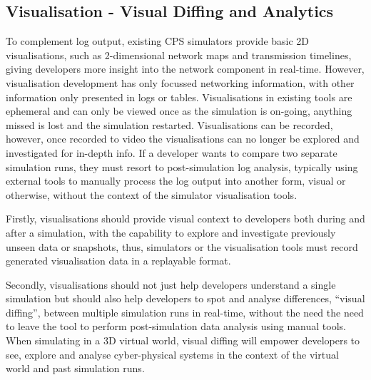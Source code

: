

\subsection{Visualisation - Visual Diffing and Analytics}
\label{sub:requirements_Visualisation}
To complement log output, existing CPS simulators provide basic 2D visualisations, such as 2-dimensional network maps and transmission timelines\cite{cooja_timeline,NS2}, giving developers more insight into the network component in real-time. However, visualisation development has only focussed networking information, with other information only presented in logs or tables. Visualisations in existing tools are ephemeral and can only be viewed once as the simulation is on-going, anything missed is lost and the simulation restarted. Visualisations can be recorded, however, once recorded to video the visualisations can no longer be explored and investigated for in-depth info. If a developer wants to compare two separate simulation runs, they must resort to post-simulation log analysis, typically using external tools to manually process the log output into another form, visual or otherwise, without the context of the simulator visualisation tools.

Firstly, visualisations should provide visual context to developers both during and after a simulation, with the capability to explore and investigate previously unseen data or snapshots, thus, simulators or the visualisation tools must record generated visualisation data in a replayable format.

Secondly, visualisations should not just help developers understand a single simulation but should also help developers to spot and analyse differences, ``visual diffing'', between multiple simulation runs in real-time, without the need the need to leave the tool to perform post-simulation data analysis using manual tools. When simulating in a 3D virtual world, visual diffing will empower developers to see, explore and analyse cyber-physical systems in the context of the virtual world and past simulation runs.

